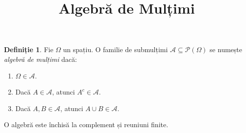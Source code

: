 \documentclass[12pt]{article}
\title{Algebră de Mulțimi}
\author{}
\date{}
\theoremstyle{definition}
\newtheorem{definition}{Definiție}
\begin{document}
\maketitle

\begin{definition}
Fie $\Omega$ un spațiu. O familie de submulțimi $\mathcal{A} \subseteq \mathcal{P}(\Omega)$ se numește \emph{algebră de mulțimi} dacă:
\begin{enumerate}
    \item $\Omega \in \mathcal{A}$.
    \item Dacă $A \in \mathcal{A}$, atunci $A^{c} \in \mathcal{A}$.
    \item Dacă $A, B \in \mathcal{A}$, atunci $A \cup B \in \mathcal{A}$.
\end{enumerate}
\end{definition}

\noindent
O algebră este închisă la complement și reuniuni finite.
\end{document}
